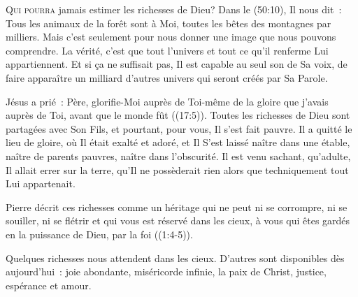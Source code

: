 
\lettrine{Q}{ui pourra} jamais estimer les richesses de Dieu?
 Dans le (50:10), Il nous dit~: 
 \og Tous les animaux de la forêt sont à Moi,
 toutes les bêtes des montagnes par milliers. \fg{}
 Mais c'est seulement pour nous donner une image que nous pouvons comprendre.
 La vérité, c'est que tout l'univers et tout ce qu'il renferme
 Lui appartiennent. Et si ça ne suffisait pas, Il est capable au seul son
 de Sa voix, de faire apparaître un milliard d'autres univers
 qui seront créés par Sa Parole.

Jésus a prié~: 
 \og Père, glorifie-Moi auprès de Toi-même de la gloire
 que j'avais auprès de Toi, avant que le monde fût \fg{}
 ((17:5)).
 Toutes les richesses de Dieu sont partagées avec Son Fils, et pourtant,
 pour vous, Il s'est fait pauvre. Il a quitté le lieu de gloire,
 où Il était exalté et adoré, et Il S'est laissé naître dans une étable,
 naître de parents pauvres, naître dans l'obscurité.
 Il est venu sachant, qu'adulte, Il allait errer sur la terre,
 qu'Il ne possèderait rien alors que techniquement tout Lui appartenait.


Pierre décrit ces richesses comme \og un héritage qui ne peut ni se corrompre,
 ni se souiller, ni se flétrir et qui vous est réservé dans les cieux,
 à vous qui êtes gardés en la puissance de Dieu, par la foi \fg{}
 ((1:4-5)). 

Quelques richesses nous attendent dans les cieux.
 D'autres sont disponibles dès aujourd'hui~:
 joie abondante, miséricorde infinie, la paix de Christ,
 justice, espérance et amour.

\dvrule






